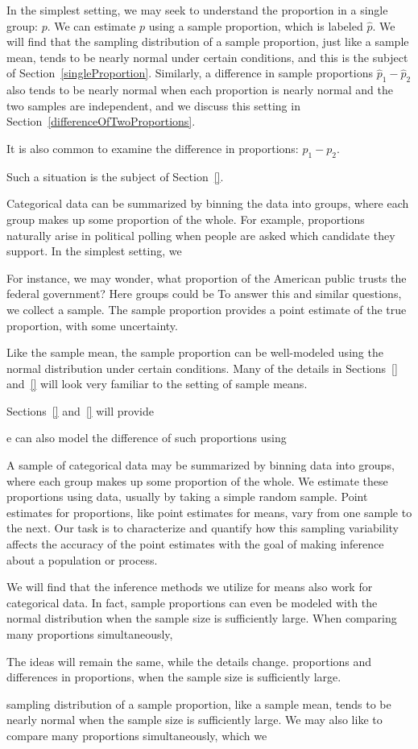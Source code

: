  In the simplest setting, we may seek to understand the proportion in a single group: $p$. We can estimate $p$ using a sample proportion, which is labeled $\hat{p}$. We will find that the sampling distribution of a sample proportion, just like a sample mean, tends to be nearly normal under certain conditions, and this is the subject of Section~\ref{singleProportion}. Similarly, a difference in sample proportions $\hat{p}_1 - \hat{p}_2$ also tends to be nearly normal when each proportion is nearly normal and the two samples are independent, and we discuss this setting in Section~\ref{differenceOfTwoProportions}.



It is also common to examine the difference in proportions: $p_1 - p_2$. 

Such a situation is the subject of Section~\ref{}.



Categorical data can be summarized by binning the data into groups, where each group makes up some proportion of the whole. For example, proportions naturally arise in political polling when people are asked which candidate they support. In the simplest setting, we 

For instance, we may wonder, what proportion of the American public trusts the federal government? Here groups could be  To answer this and similar questions, we collect a sample. The sample proportion provides a point estimate of the true proportion, with some uncertainty.

Like the sample mean, the sample proportion can be well-modeled using the normal distribution under certain conditions. Many of the details in Sections~\ref{} and~\ref{} will look very familiar to the setting of sample means.

Sections~\ref{} and~\ref{} will provide

e can also model the difference of such proportions using 

A sample of categorical data may be summarized by binning data into groups, where each group makes up some proportion of the whole. We estimate these proportions using data, usually by taking a simple random sample. Point estimates for proportions, like point estimates for means, vary from one sample to the next. Our task is to characterize and quantify how this sampling variability affects the accuracy of the point estimates with the goal of making inference about a population or process.

We will find that the inference methods we utilize for means also work for categorical data. In fact, sample proportions can even be modeled with the normal distribution when the sample size is sufficiently large. When comparing many proportions simultaneously,

The ideas will remain the same, while the details change. proportions and differences in proportions, when the sample size is sufficiently large.

sampling distribution of a sample proportion, like a sample mean, tends to be nearly normal when the sample size is sufficiently large. We may also like to compare many proportions simultaneously, which we 

